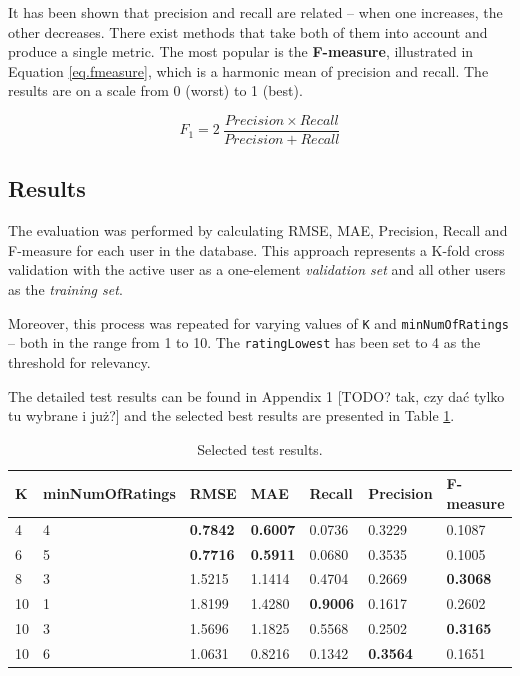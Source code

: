 \documentclass[12pt]{report}
\begin{document}
It has been shown that precision and recall are related -- when one increases, the other decreases. There exist methods that take both of them into account and produce a single metric. The most popular is the {\bf F-measure}, illustrated in Equation \ref{eq.fmeasure}, which is a harmonic mean of precision and recall. The results are on a scale from 0 (worst) to 1 (best).

\begin{equation}
F_1 = 2\:\frac{Precision \times Recall}{Precision + Recall}
\label{eq.fmeasure}
\end{equation}
\hbox{}

\subsection{Results}

The evaluation was performed by calculating RMSE, MAE, Precision, Recall and F-measure for each user in the database. This approach represents a K-fold cross validation with the active user as a one-element \textit{validation set} and all other users as the \textit{training set}.

Moreover, this process was repeated for varying values of \texttt{K} and \texttt{minNumOf\-Ratings} -- both in the range from 1 to 10. The \texttt{ratingLowest} has been set to 4 as the threshold for relevancy.

The detailed test results can be found in Appendix 1 [TODO? tak, czy dać tylko tu wybrane i już?] and the selected best results are presented in Table \ref{table.results}.

\begin{table}[!h]
\centering
\caption{Selected test results.}
\label{table.results}
\vspace{3mm}
\begin{tabular}{|l|l|l|l|l|l|l|}
\hline
K  & minNumOfRatings  & RMSE         & MAE          & Recall       & Precision    & F-measure     \\ \hline
4  & 4  & {\bf 0.7842} & {\bf 0.6007} & 0.0736       & 0.3229       & 0.1087       \\ \hline
6  & 5  & {\bf 0.7716} & {\bf 0.5911} & 0.0680       & 0.3535       & 0.1005       \\ \hline
8  & 3  & 1.5215       & 1.1414       & 0.4704       & 0.2669       & {\bf 0.3068} \\ \hline
10 & 1  & 1.8199       & 1.4280       & {\bf 0.9006} & 0.1617       & 0.2602       \\ \hline
10 & 3  & 1.5696       & 1.1825       & 0.5568       & 0.2502       & {\bf 0.3165} \\ \hline
10 & 6  & 1.0631       & 0.8216       & 0.1342       & {\bf 0.3564} & 0.1651       \\ \hline
\end{tabular}
\end{table}
\end{document}
